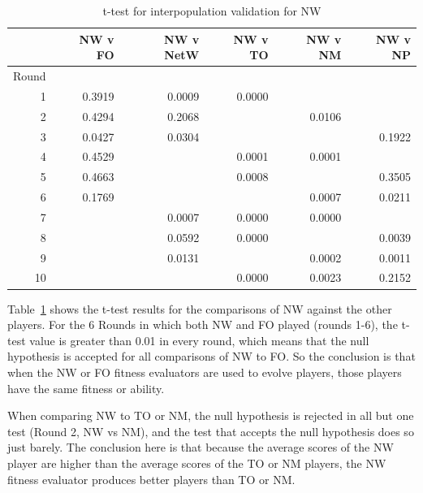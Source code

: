 \begin{table}[htbp]
  \centering
  \caption{t-test for interpopulation validation for NW}
    \begin{tabular}{rrrrrr}
    \toprule
          & NW v FO & NW v NetW & NW v TO & NW v NM & NW v NP \\
    \midrule
    Round &         &           &         &         &        \\
    1     & 0.3919  & 0.0009    & 0.0000  &         &        \\
    2     & 0.4294  & 0.2068    &         & 0.0106  &        \\
    3     & 0.0427  & 0.0304    &         &         & 0.1922 \\
    4     & 0.4529  &           & 0.0001  & 0.0001  &        \\
    5     & 0.4663  &           & 0.0008  &         & 0.3505 \\
    6     & 0.1769  &           &         & 0.0007  & 0.0211 \\
    7     &         & 0.0007    & 0.0000  & 0.0000  &        \\
    8     &         & 0.0592    & 0.0000  &         & 0.0039 \\
    9     &         & 0.0131    &         & 0.0002  & 0.0011 \\
    10    &         &           & 0.0000  & 0.0023  & 0.2152 \\
    \bottomrule
    \end{tabular}%
  \label{tab:interpop_ttest1}%
\end{table}%

Table~\ref{tab:interpop_ttest1} shows the t-test results for the comparisons of
NW against the other players. For the 6 Rounds in which both NW and FO played
(rounds 1-6), the t-test value is greater than 0.01 in every round, which means
that the null hypothesis is accepted for all comparisons of NW to FO. So the
conclusion is that when the NW or FO fitness evaluators are used to evolve
players, those players have the same fitness or ability.

When comparing NW to TO or NM, the null hypothesis is rejected in all but one
test (Round 2, NW vs NM), and the test that accepts the null hypothesis does so
just barely. The conclusion here is that because the average scores of the NW
player are higher than the average scores of the TO or NM players, the NW
fitness evaluator produces better players than TO or NM.


